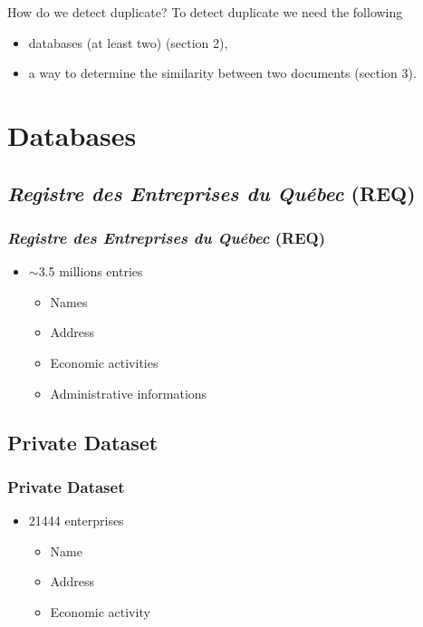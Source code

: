\documentclass{beamer}
\begin{document}
	\begin{frame}{How do we detect duplicate?}
		To detect duplicate we need the following \cite{christen2012data} 
		\begin{itemize}
			\item databases (at least two) (section 2),
			\item a way to determine the similarity between two documents (section 3).
		\end{itemize}
	\end{frame}
	
	\section{Databases}
	\subsection{\textit{Registre des Entreprises du Québec} (REQ)}
	
	\begin{frame}[label=REQ]\frametitle{\textit{Registre des Entreprises du Québec} (REQ)} 
		\begin{itemize}
			\item<1-> $\sim$3.5 millions entries \cite{contenureq}
			\begin{itemize}
				\item Names
				\item Address
				\item Economic activities
				\item Administrative informations
			\end{itemize}
		\end{itemize}
	\end{frame}
	
	\subsection{Private Dataset}
	\begin{frame}[label=intact]\frametitle{Private Dataset} 
		\begin{itemize}
			\item<1-> \num{21444} enterprises
			\begin{itemize}
				\item Name
				\item Address
				\item Economic activity
			\end{itemize}
		\end{itemize}
	\end{frame}
	
\end{document}
